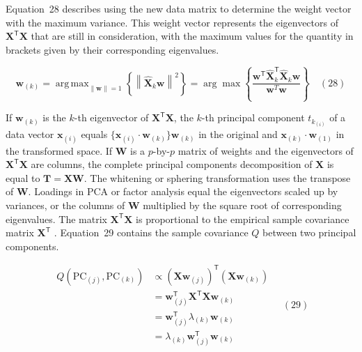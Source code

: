 \documentclass[preprint,12pt]{elsarticle}
\begin{document}
Equation~28 describes using the new data matrix to determine the weight vector with the maximum variance. This weight vector represents the eigenvectors of $\mathbf{X}^{\mathsf{T}}\mathbf{X}$ that are still in consideration, with the maximum values for the quantity in brackets given by their corresponding eigenvalues. 

\begin{equation}
    \mathbf{w}_{\left(k\right)}=\mathop{\operatorname{arg\,max}}_{\left\|\mathbf{w} \right\|=1}\left\{\left\|\mathbf{\hat{X}}_{k}\mathbf{w} \right\|^{2}\right\}=\arg \max \left\{{\frac{\mathbf{w}^{\mathsf{T}}\mathbf{\hat{X}}_{k}^{\mathsf{T}}\mathbf{\hat{X}}_{k}\mathbf{w}}{\mathbf{w}^{T}\mathbf{w}}}\right\}
	\quad\left(28\right)
\end{equation}

If $\mathbf{w}_{\left(k\right)}$ is the $k$-th eigenvector of $\mathbf{X}^{\mathsf{T}}\mathbf{X}$, the $k$-th principal component $t_{k_{\left(i\right)}}$ of a data vector $\mathbf{x}_{\left(i\right)}$ equals $\{\mathbf{x}_{\left(i\right)} \cdot \mathbf{w}_{\left(k\right)}\} \mathbf{w}_{\left(k\right)}$ in the original and $\mathbf{x}_{\left(k\right)} \cdot \mathbf{w}_{\left(1\right)}$ in the transformed space. If $\mathbf{W}$ is a $p$-by-$p$ matrix of weights and the eigenvectors of $\mathbf{X}^{\mathsf{T}}\mathbf{X}$ are columns, the complete principal components decomposition of $\mathbf{X}$ is equal to $\mathbf{T} =\mathbf{X} \mathbf{W}$. The whitening or sphering transformation uses the transpose of $\mathbf{W}$. Loadings in PCA or factor analysis equal the eigenvectors scaled up by variances, or the columns of $\mathbf{W}$ multiplied by the square root of corresponding eigenvalues. The matrix $\mathbf{X}^{\mathsf{T}}\mathbf{X}$ is proportional to the empirical sample covariance matrix $\mathbf{X}^{\mathsf{T}}$ \cite{jolliffe2002principal}. Equation~29 contains the sample covariance $Q$ between two principal components.

\begin{equation}
	\begin{aligned}
        Q(\mathrm{PC}_{(j)},\mathrm{PC}_{\left(k\right)})&\propto (\mathbf{X} \mathbf{w}_{(j)})^{\mathsf{T}}(\mathbf{X} \mathbf{w}_{\left(k\right)})\\&=\mathbf{w}_{(j)}^{\mathsf{T}}\mathbf{X}^{\mathsf{T}}\mathbf{X} \mathbf{w}_{\left(k\right)}\\&=\mathbf{w}_{(j)}^{\mathsf{T}}\lambda_{\left(k\right)}\mathbf{w}_{\left(k\right)}\\&=\lambda_{\left(k\right)}\mathbf{w}_{(j)}^{\mathsf{T}}\mathbf{w}_{\left(k\right)}
    \end{aligned}
	\quad\left(29\right)
\end{equation}
\end{document}
